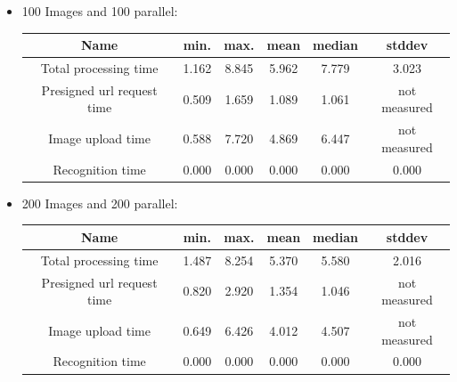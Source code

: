 \documentclass[conference]{IEEEtran}
\begin{document}
\begin{itemize}
	
	\item 	 100 Images and 100 parallel:
	\begin{table}[h]
		\begin{tabulary}{\textwidth}{|C|C|C|C|C|C|}
			\hline
			\textbf{Name} &
			\textbf{min.} &
			\textbf{max.} &
			\textbf{mean} &
			\textbf{median} &
			\textbf{stddev}
			\\\hline
			Total processing time & 1.162 & 8.845 & 5.962 & 7.779 & 3.023 \\\hline
			Presigned url request time & 0.509 & 1.659 & 1.089 & 1.061 & not measured \\\hline
			Image upload time & 0.588 & 7.720 & 4.869 & 6.447 & not measured \\\hline
			Recognition time & 0.000 & 0.000 & 0.000 & 0.000 & 0.000 \\\hline
		\end{tabulary} 
	\end{table}
	\item 	 200 Images and 200 parallel:
	\begin{table}[h]
		\begin{tabulary}{\textwidth}{|C|C|C|C|C|C|}
			\hline
			\textbf{Name} &
			\textbf{min.} &
			\textbf{max.} &
			\textbf{mean} &
			\textbf{median} &
			\textbf{stddev}
			\\\hline
			Total processing time & 1.487 & 8.254 & 5.370 & 5.580 & 2.016 \\\hline
			Presigned url request time & 0.820 & 2.920 & 1.354 & 1.046 & not measured \\\hline
			Image upload time & 0.649 & 6.426 & 4.012 & 4.507 & not measured \\\hline
			Recognition time & 0.000 & 0.000 & 0.000 & 0.000 & 0.000 \\\hline
		\end{tabulary} 
	\end{table}
\end{itemize}
\end{document}
